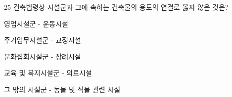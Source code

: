\begin{question}{25}
건축법령상 시설군과 그에 속하는 건축물의 용도의 연결로 옳지 않은 것은?
\begin{choices}
  \item 영업시설군 - 운동시설
  \item 주거업무시설군 - 교정시설
  \item 문화집회시설군 - 장례시설
  \item 교육 및 복지시설군 - 의료시설
  \item 그 밖의 시설군 - 동물 및 식물 관련 시설
\end{choices}
\end{question}
